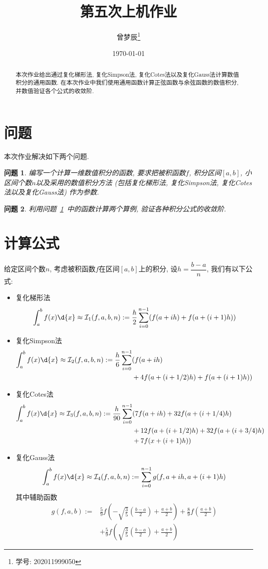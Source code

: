 \documentclass[a4paper]{ctexart}
\title{第五次上机作业}
\author{曾梦辰\thanks{学号: 202011999050}}
\date{\today}
\theoremstyle{plain}
\newtheorem{pro}{问题}
\begin{document}
\maketitle

\begin{abstract}
    本次作业给出通过复化梯形法, 复化Simpson法, 复化Cotes法以及复化Gauss法计算数值积分的通用函数.
    在本次作业中我们使用通用函数计算正弦函数与余弦函数的数值积分, 并数值验证各个公式的收敛阶.
\end{abstract}

\section{问题}
本次作业解决如下两个问题.
\begin{pro}\label{pro1}
    编写一个计算一维数值积分的函数, 要求把被积函数$f$, 积分区间$[a,b]$, 小区间个数$n$以及采用的数值积分方法 (包括复化梯形法, 复化Simpson法, 复化Cotes法以及复化Gauss法) 作为参数.
\end{pro}

\begin{pro}
    利用问题~\ref{pro1}~中的函数计算两个算例, 验证各种积分公式的收敛阶.
\end{pro}

\section{计算公式}
给定区间个数$n$, 考虑被积函数$f$在区间$[a,b]$上的积分, 设$h=\dfrac{b-a}{n}$, 我们有以下公式:
\begin{itemize}
    \item 复化梯形法
    \[\int_a^bf(x)\d{x}\approx\mathcal{I}_1(f,a,b,n):=\frac{h}{2}\sum_{i=0}^{n-1}(f(a+ih)+f(a+(i+1)h))\]
    \item 复化Simpson法
    \begin{align*}
        \int_a^bf(x)\d{x}\approx\mathcal{I}_2(f,a,b,n):=\frac{h}{6}\sum_{i=0}^{n-1}&(f(a+ih)\\
        &+4f(a+(i+1/2)h)+f(a+(i+1)h))
    \end{align*}
    \item 复化Cotes法
    \begin{align*}
        \int_a^bf(x)\d{x}\approx\mathcal{I}_3(f,a,b,n):=\frac{h}{90}\sum_{i=0}^{n-1}&(7f(a+ih)+32f(a+(i+1/4)h)\\
        &+12f(a+(i+1/2)h)+32f(a+(i+3/4)h)\\
        &+7f(x+(i+1)h))
    \end{align*}
    \item 复化Gauss法
    \[\int_a^bf(x)\d{x}\approx\mathcal{I}_4(f,a,b,n):=\sum_{i=0}^{n-1}g(f,a+ih,a+(i+1)h)\]
    其中辅助函数
    \begin{align*}
        g(f,a,b):=&\frac{5}{9}f\left(-\sqrt{\frac{3}{5}}\left(\frac{b-a}{2}\right)+\frac{a+b}{2}\right)+\frac{8}{9}f\left(\frac{a+b}{2}\right)\\
        &+\frac{5}{9}f\left(\sqrt{\frac{3}{5}}\left(\frac{b-a}{2}\right)+\frac{a+b}{2}\right)
    \end{align*}
\end{itemize}
\end{document}
